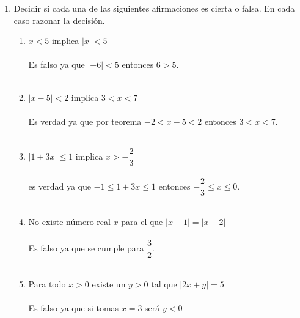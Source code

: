 \begin{enumerate}
\item Decidir si cada una de las siguientes afirmaciones es cierta o falsa. En cada caso razonar la decisión.
\begin{enumerate}[\bfseries (a)]
\item $x<5$ implica $|x|<5$\\\\
Es falso ya que $|-6|<5$ entonces $6>5$.\\\\
\item $|x-5|<2$ implica $3<x<7$\\\\
Es verdad ya que por teorema $-2 < x-5 < 2$ entonces $3<x<7$.\\\\
\item $|1 + 3x| \leq 1$ implica $x > - \dfrac{2}{3}$ \\\\
es verdad ya que $-1\leq 1 + 3x \leq 1$ entonces $-\dfrac{2}{3} \leq x \leq 0$.\\\\
\item No existe número real $x$ para el que $|x-1|= |x-2|$\\\\
Es falso ya que se cumple para $\dfrac{3}{2}$.\\\\
\item Para todo $x>0$ existe un $y>0$ tal que $|2x + y|=5$\\\\
Es falso ya que si tomas $x=3$ será $y<0$\\\\
\end{enumerate}


\end{enumerate}
